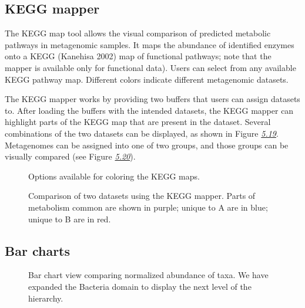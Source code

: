 \documentclass[letterpaper,10pt,english]{sphinxmanual}
\begin{document}
\subsection{KEGG mapper}
\label{\detokenize{user_manual:kegg-mapper}}\label{\detokenize{user_manual:section-kegg-mapper}}
The KEGG map tool allows the visual comparison of predicted metabolic
pathways in metagenomic samples. It maps the abundance of identified
enzymes onto a KEGG (Kanehisa 2002) map of functional pathways; note
that the mapper is available only for functional data). Users can select
from any available KEGG pathway map. Different colors indicate different
metagenomic datasets.

The KEGG mapper works by providing two buffers that users can assign
datasets to. After loading the buffers with the intended datasets, the
KEGG mapper can highlight parts of the KEGG map that are present in the
dataset. Several combinations of the two datasets can be displayed, as
shown in Figure {\hyperref[\detokenize{user_manual:fig:analysis-page-kegg-mapper-options}]{\emph{5.19}}}.
Metagenomes can be assigned into one of two groups, and those groups can
be visually compared (see Figure
{\hyperref[\detokenize{user_manual:fig:analysis-page-kegg-mapper-example}]{\emph{5.20}}}).

\begin{figure}[htbp]
\centering
\capstart

\noindent{}
\caption{Options available for coloring the KEGG maps.}\label{\detokenize{user_manual:fig-analysis-page-kegg-mapper-options}}\end{figure}

\begin{figure}[htbp]
\centering
\capstart

\noindent{}
\caption{Comparison of two datasets using the KEGG mapper. Parts of metabolism
common are shown in purple; unique to A are in blue; unique to B are
in red.}\label{\detokenize{user_manual:fig-analysis-page-kegg-mapper-example}}\end{figure}


\subsection{Bar charts}
\label{\detokenize{user_manual:bar-charts}}\label{\detokenize{user_manual:section-bar-charts}}
\begin{figure}[htbp]
\centering
\capstart

\noindent{}
\caption{Bar chart view comparing normalized abundance of taxa. We have
expanded the Bacteria domain to display the next level of the
hierarchy.}\label{\detokenize{user_manual:fig-analysis-page-bar-chart}}\end{figure}
\end{document}
